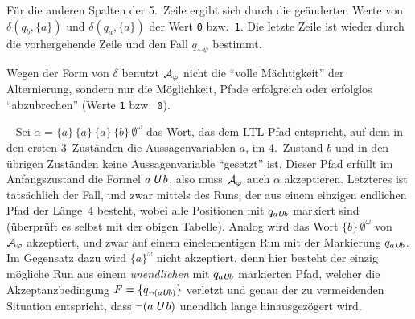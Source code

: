 \documentclass[fontsize=11pt, twoside=false, numbers=autoenddot]{scrbook}
\begin{document}
%
Für die anderen Spalten der 5.\ Zeile ergibt sich durch die geänderten Werte von
$\delta(q_b, \{a\})$ und $\delta(q_a, \{a\})$ der Wert \texttt{0} bzw.\ \texttt{1}.
Die letzte Zeile ist wieder durch die vorhergehende Zeile und den Fall $q_{\mathord{\sim}\psi}$ bestimmt.

Wegen der Form von $\delta$ benutzt $\mathcal{A}_\varphi$ nicht die "`volle Mächtigkeit"' der Alternierung,
sondern nur die Möglichkeit, Pfade erfolgreich oder erfolglos "`abzubrechen"' (Werte \texttt{1} bzw.\ \texttt{0}).

\par\medskip
{}~
Sei $\alpha=\{a\}\,\{a\}\,\{a\}\,\{b\}\,\emptyset^\omega$ das Wort, das dem LTL-Pfad entspricht,
auf dem in den ersten 3~Zuständen die Aussagenvariablen $a$, im 4.~Zustand $b$ und
in den übrigen Zuständen keine Aussagenvariable "`gesetzt"' ist.
Dieser Pfad erfüllt im Anfangszustand die Formel $a \mathbin{\textit{\textsf{U}}} b$, also muss $\mathcal{A}_\varphi$
auch $\alpha$ akzeptieren. Letzteres ist tatsächlich der Fall, und zwar mittels des Runs, 
der aus einem einzigen endlichen Pfad der Länge~4 besteht,
wobei alle Positionen mit $q_{a\mathbin{\textit{\textsf{U}}} b}$ markiert sind
(überprüft es selbst mit der obigen Tabelle).
Analog wird das Wort $\{b\}\,\emptyset^\omega$ von $\mathcal{A}_\varphi$ akzeptiert,
und zwar auf einem einelementigen Run mit der Markierung $q_{a\mathbin{\textit{\textsf{U}}} b}$.
Im Gegensatz dazu wird $\{a\}^\omega$ nicht akzeptiert,
denn hier besteht der einzig mögliche Run aus einem \emph{unendlichen}
mit $q_{a\mathbin{\textit{\textsf{U}}} b}$ markierten Pfad, welcher die Akzeptanzbedingung
$F = \{q_{\lnot(a \mathbin{\textit{\textsf{U}}} b)}\}$ verletzt
und genau der zu vermeidenden Situation entspricht,
dass $\lnot(a \mathbin{\textit{\textsf{U}}} b)$ unendlich lange hinausgezögert wird.
\end{document}
